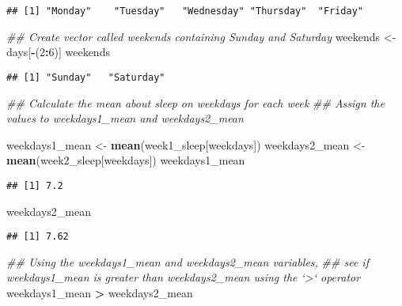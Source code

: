 \documentclass[
]{article}
\newenvironment{Shaded}{\begin{snugshade}}{\end{snugshade}}
\newcommand{\CommentTok}[1]{\textcolor[rgb]{0.56,0.35,0.01}{\textit{#1}}}
\newcommand{\DecValTok}[1]{\textcolor[rgb]{0.00,0.00,0.81}{#1}}
\newcommand{\KeywordTok}[1]{\textcolor[rgb]{0.13,0.29,0.53}{\textbf{#1}}}
\newcommand{\NormalTok}[1]{#1}
\newcommand{\OperatorTok}[1]{\textcolor[rgb]{0.81,0.36,0.00}{\textbf{#1}}}
\newcommand{\StringTok}[1]{\textcolor[rgb]{0.31,0.60,0.02}{#1}}
\begin{document}
\begin{verbatim}
## [1] "Monday"    "Tuesday"   "Wednesday" "Thursday"  "Friday"
\end{verbatim}

\begin{Shaded}
\begin{Highlighting}[]
\CommentTok{## Create vector called weekends containing Sunday and Saturday}
\NormalTok{weekends <-}\StringTok{ }\NormalTok{days[}\OperatorTok{-}\NormalTok{(}\DecValTok{2}\OperatorTok{:}\DecValTok{6}\NormalTok{)]}
\NormalTok{weekends}
\end{Highlighting}
\end{Shaded}

\begin{verbatim}
## [1] "Sunday"   "Saturday"
\end{verbatim}

\begin{Shaded}
\begin{Highlighting}[]
\CommentTok{## Calculate the mean about sleep on weekdays for each week}
\CommentTok{## Assign the values to weekdays1_mean and weekdays2_mean}

\NormalTok{weekdays1_mean <-}\StringTok{ }\KeywordTok{mean}\NormalTok{(week1_sleep[weekdays])}
\NormalTok{weekdays2_mean <-}\StringTok{ }\KeywordTok{mean}\NormalTok{(week2_sleep[weekdays])}
\NormalTok{weekdays1_mean}
\end{Highlighting}
\end{Shaded}

\begin{verbatim}
## [1] 7.2
\end{verbatim}

\begin{Shaded}
\begin{Highlighting}[]
\NormalTok{weekdays2_mean}
\end{Highlighting}
\end{Shaded}

\begin{verbatim}
## [1] 7.62
\end{verbatim}

\begin{Shaded}
\begin{Highlighting}[]
\CommentTok{## Using the weekdays1_mean and weekdays2_mean variables,}
\CommentTok{## see if weekdays1_mean is greater than weekdays2_mean using the `>` operator}
\NormalTok{weekdays1_mean }\OperatorTok{>}\StringTok{ }\NormalTok{weekdays2_mean}
\end{Highlighting}
\end{Shaded}
\end{document}

